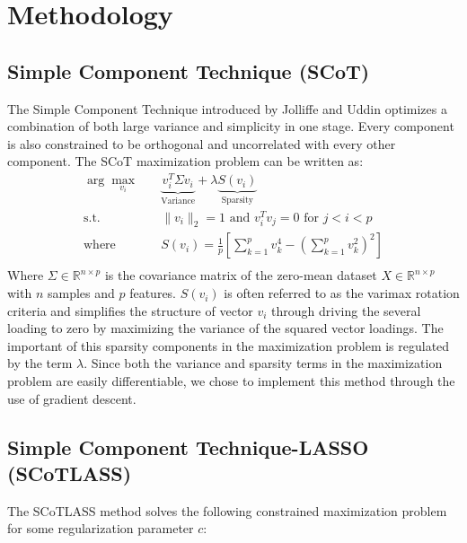 \documentclass[11pt,letterpaper]{report}
\begin{document}
\section*{Methodology}


\subsection*{Simple Component Technique (SCoT)}
The Simple Component Technique introduced by Jolliffe and Uddin \cite{Jolliffe2000} optimizes a combination of both large variance and simplicity in one stage. Every component is also constrained to be orthogonal and uncorrelated with every other component. The SCoT maximization problem can be written as:
\begin{equation*}
\begin{aligned}
\arg\max_{v_{i}} \quad & \underbrace{v_{i}^{T}\Sigma v_{i}}_{\text{Variance}} + \lambda \underbrace{S(v_{i})}_{\text{Sparsity}}\\
\textrm{s.t.} \quad & \lVert v_{i} \rVert_{2} = 1 \text{ and } v_{i}^{T}v_{j} = 0 \text{ for } j < i < p \\
\textrm{where} \quad & S(v_{i}) = \frac{1}{p}\left[\sum_{k=1}^{p} v_{k}^4- (\sum_{k=1}^{p} v_{k}^2)^2 \right]\\ 
\end{aligned}
\end{equation*}
Where $\Sigma\in\mathbb{R}^{n \times p}$ is the covariance matrix of the zero-mean dataset $X \in \mathbb{R}^{n\times p}$ with $n$ samples and $p$ features. $S(v_i)$ is often referred to as the varimax rotation criteria and simplifies the structure of vector $v_i$ through driving the several loading to zero by maximizing the variance of the squared vector loadings. The important of this sparsity components in the maximization problem is regulated by the term $\lambda$. Since both the variance and sparsity terms in the maximization problem are easily differentiable, we chose to implement this method through the use of gradient descent.

\subsection*{Simple Component Technique-LASSO (SCoTLASS)}
The SCoTLASS method solves the following constrained maximization problem for some regularization parameter $c$:
\end{document}

